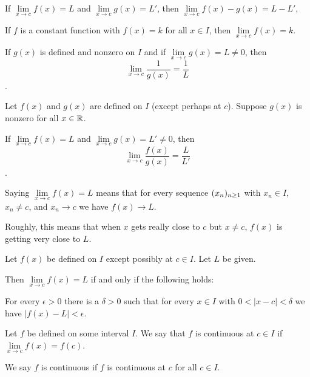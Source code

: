 \begin{corollary}
    If $\lim\limits_{x \to c} f(x) = L $ and $\lim\limits_{x \to c} g(x) = L' $, then
    $\lim\limits_{x \to c} f(x)-g(x) = L-L'$,
\end{corollary}


\begin{remark}
    If $f$ is a constant function with $f(x)=k$ for all $x \in I$, then 
    $\lim\limits_{x \to c} f(x) = k$.
\end{remark}


\begin{prop}
    If $g(x)$ is defined and nonzero on $I$ and if $\lim\limits_{x \to c} g(x) = L \neq 0 $,
    then \[\lim_{x \to c} \frac{1}{g(x)} = \frac{1}{L} \].
\end{prop}


\begin{corollary}
    Let $f(x)$ and $g(x)$ are defined on $I$ (except perhaps at $c$). Suppose 
    $g(x)$ is nonzero for all $x\in\mathbb{R}$. 

    If $\lim\limits_{x \to c} f(x) = L $ and $\lim\limits_{x \to c} g(x) = L' \neq 0 $, 
    then \[\lim_{x \to c} \frac{f(x)}{g(x)} = \frac{L}{L'}\].
\end{corollary}


\begin{remark}
    Saying $\lim\limits_{x \to c} f(x)=L$ means that for every sequence $(x_n)_{n\geq1}$
    with $x_n \in I$, $x_n \neq c$, and $x_n \to c$ we have $f(x) \to L$.

    Roughly, this means that when $x$ gets really close to $c$ but $x \neq c$, 
    $f(x)$ is getting very close to $L$.
\end{remark}


\begin{prop}
    Let $f(x)$ be defined on $I$ except possibly at $c \in I$. Let $L$ be given.

    Then $\lim\limits_{x \to c} f(x)=L$ if and only if the following holds:

    For every $\epsilon >  0$ there is a $\delta > 0$ such that for every
    $x \in I$ with $0 < |x-c| < \delta$ we have $|f(x) - L| < \epsilon$.
\end{prop}


\begin{defn}
    Let $f$ be defined on some interval $I$. We say that $f$ is continuous at 
    $c \in I$ if $\lim\limits_{x \to c} f(x) = f(c)$.

    We say $f$ is continuous if $f$ is continuous at $c$ for all $c \in I$.
\end{defn}



